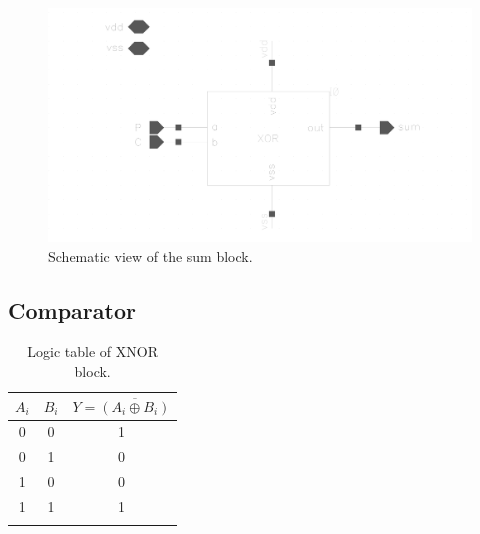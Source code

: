 \begin{figure}[H]
  \centering
  \captionsetup{justification=centering}
  \includegraphics[clip,width=1.0\textwidth]{../figures/sum}
  \caption{Schematic view of the sum block.} \label{fig:sum}
\end{figure}

\subsection{Comparator}
\begin{table}[H]
  \caption{Logic table of XNOR block.}
  \centering
  \begin{tabular}{cc|c}
    \toprule
    $A_i$ & $B_i$ & $Y = \overline{(A_i \oplus B_i)}$ \\
    \midrule
    0 & 0 & 1 \\
    0 & 1 & 0 \\
    1 & 0 & 0 \\
    1 & 1 & 1 \\
    \bottomrule
    \label{tab:xnor}
  \end{tabular}
\end{table}

